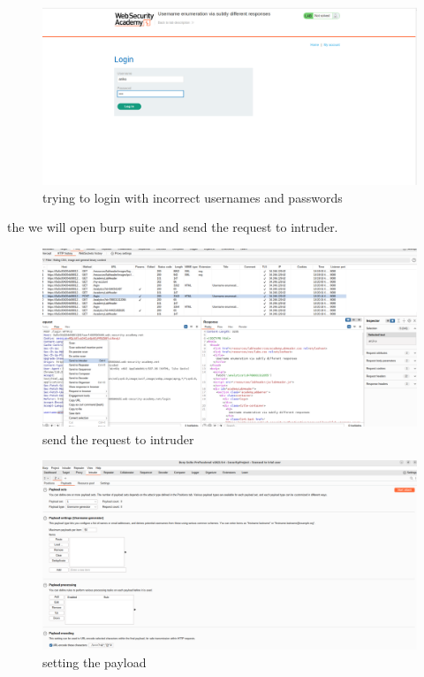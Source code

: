 \documentclass[
	a4paper, %
	12pt, %
]{CSSullivanBusinessReport}
\begin{document}
\begin{fullwidth}
\begin{figure}[H]
    \centering
    \includegraphics[width=1\textwidth]{Images/anikaScreensots/enumeratinStart.png}
    \caption{trying to login with incorrect usernames and passwords}
    \label{fig:enter-label}
\end{figure}
	

the we will open burp suite and send the request to intruder.   

\begin{figure}[H]
    \centering
    \includegraphics[width=1\textwidth]{Images/anikaScreensots/EnuStep1.png}
    \caption{send the request to intruder}
    \label{fig:enter-label}
\end{figure}

\begin{figure}[H]
    \centering
    \includegraphics[width=1\textwidth]{Images/anikaScreensots/STEP2.png}
    \caption{setting the payload}
    \label{fig:enter-label}
\end{figure}



\end{fullwidth}
\end{document}
